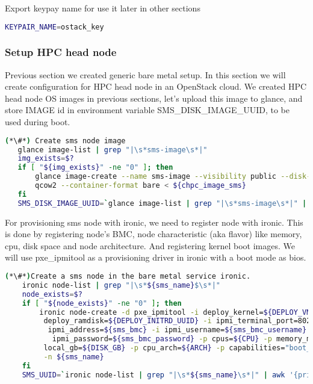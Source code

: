 Export keypay name for use it later in other sections

\begin{lstlisting}[language=bash,keywords={}]
    KEYPAIR_NAME=ostack_key
\end{lstlisting}

\subsubsection{Setup HPC head node}


Previous section we created generic bare metal setup. In this section we will create configuration for HPC head node in an OpenStack cloud.
We created HPC head node OS images in previous sections, let's upload this image to glance, and store IMAGE id in environment variable SMS\_DISK\_IMAGE\_UUID, to be used during boot. 

\begin{lstlisting}[language=bash,keywords={}]
(*\#*) Create sms node image
   glance image-list | grep "|\s*sms-image\s*|"
   img_exists=$?
   if [ "${img_exists}" -ne "0" ]; then
       glance image-create --name sms-image --visibility public --disk-format \
       qcow2 --container-format bare < ${chpc_image_sms}
   fi
   SMS_DISK_IMAGE_UUID=`glance image-list | grep "|\s*sms-image\s*|" | awk '{print $2}'`
\end{lstlisting}

For provisioning sms node with ironic, we need to register node with ironic. This is done by registering node's BMC, node characteristic (aka flavor) like memory, cpu, disk space and node architecture. And registering kernel boot images. We will use pxe\_ipmitool as a provisioning driver in ironic with a boot mode as bios.

\begin{lstlisting}[language=bash,keywords={}]
(*\#*)Create a sms node in the bare metal service ironic.
    ironic node-list | grep "|\s*${sms_name}$\s*|"
    node_exists=$?
    if [ "${node_exists}" -ne "0" ]; then 
        ironic node-create -d pxe_ipmitool -i deploy_kernel=${DEPLOY_VMLINUZ_UUID} -i \
         deploy_ramdisk=${DEPLOY_INITRD_UUID} -i ipmi_terminal_port=8023 -i \
          ipmi_address=${sms_bmc} -i ipmi_username=${sms_bmc_username} -i \
           ipmi_password=${sms_bmc_password} -p cpus=${CPU} -p memory_mb=${RAM_MB} -p \
         local_gb=${DISK_GB} -p cpu_arch=${ARCH} -p capabilities="boot_mode:bios" \
         -n ${sms_name}
    fi
    SMS_UUID=`ironic node-list | grep "|\s*${sms_name}\s*|" | awk '{print $2}'`
\end{lstlisting}

